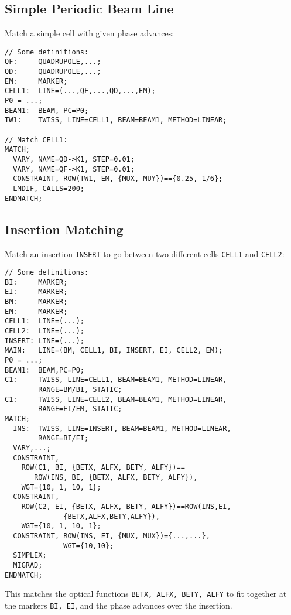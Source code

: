 \subsection{Simple Periodic Beam Line}
Match a simple cell with given phase advances:
\begin{verbatim}
// Some definitions:
QF:     QUADRUPOLE,...;
QD:     QUADRUPOLE,...;
EM:     MARKER;
CELL1:  LINE=(...,QF,...,QD,...,EM);
P0 = ...;
BEAM1:  BEAM, PC=P0;
TW1:    TWISS, LINE=CELL1, BEAM=BEAM1, METHOD=LINEAR;

// Match CELL1:
MATCH;
  VARY, NAME=QD->K1, STEP=0.01;
  VARY, NAME=QF->K1, STEP=0.01;
  CONSTRAINT, ROW(TW1, EM, {MUX, MUY})=={0.25, 1/6};
  LMDIF, CALLS=200;
ENDMATCH;
\end{verbatim}

\subsection{Insertion Matching}
Match an insertion \texttt{INSERT} to go between
two different cells \texttt{CELL1} and \texttt{CELL2}:
\begin{verbatim}
// Some definitions:
BI:     MARKER;
EI:     MARKER;
BM:     MARKER;
EM:     MARKER;
CELL1:  LINE=(...);
CELL2:  LINE=(...);
INSERT: LINE=(...);
MAIN:   LINE=(BM, CELL1, BI, INSERT, EI, CELL2, EM);
P0 = ...;
BEAM1:  BEAM,PC=P0;
C1:     TWISS, LINE=CELL1, BEAM=BEAM1, METHOD=LINEAR,
		RANGE=BM/BI, STATIC;
C1:     TWISS, LINE=CELL2, BEAM=BEAM1, METHOD=LINEAR,
        RANGE=EI/EM, STATIC;
MATCH;
  INS:  TWISS, LINE=INSERT, BEAM=BEAM1, METHOD=LINEAR,
        RANGE=BI/EI;
  VARY,...;
  CONSTRAINT,
    ROW(C1, BI, {BETX, ALFX, BETY, ALFY})==
       ROW(INS, BI, {BETX, ALFX, BETY, ALFY}),
    WGT={10, 1, 10, 1};
  CONSTRAINT,
    ROW(C2, EI, {BETX, ALFX, BETY, ALFY})==ROW(INS,EI,
              {BETX,ALFX,BETY,ALFY}),
    WGT={10, 1, 10, 1};
  CONSTRAINT, ROW(INS, EI, {MUX, MUX})={...,...},
              WGT={10,10};
  SIMPLEX;
  MIGRAD;
ENDMATCH;
\end{verbatim}
This matches the optical functions \texttt{BETX, ALFX, BETY, ALFY} to fit
together at the markers \texttt{BI, EI}, and the phase advances over
the insertion.

